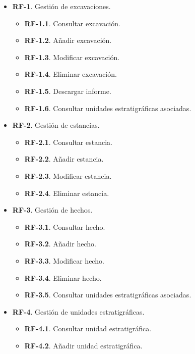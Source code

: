     \begin{itemize}
        \item \textbf{RF-1}. Gestión de excavaciones.
            \begin{itemize}
                \item \textbf{RF-1.1}. Consultar excavación.
                \item \textbf{RF-1.2}. Añadir excavación.
                \item \textbf{RF-1.3}. Modificar excavación.
                \item \textbf{RF-1.4}. Eliminar excavación.       
                \item \textbf{RF-1.5}. Descargar informe.       
                \item \textbf{RF-1.6}. Consultar unidades estratigráficas asociadas.            
            \end{itemize}
        \item \textbf{RF-2}. Gestión de estancias.
            \begin{itemize}
                \item \textbf{RF-2.1}. Consultar estancia.
                \item \textbf{RF-2.2}. Añadir estancia.
                \item \textbf{RF-2.3}. Modificar estancia.
                \item \textbf{RF-2.4}. Eliminar estancia.       
            \end{itemize}
        \item \textbf{RF-3}. Gestión de hechos.
            \begin{itemize}
                \item \textbf{RF-3.1}. Consultar hecho.
                \item \textbf{RF-3.2}. Añadir hecho.
                \item \textbf{RF-3.3}. Modificar hecho.
                \item \textbf{RF-3.4}. Eliminar hecho. 
                \item \textbf{RF-3.5}. Consultar unidades estratigráficas asociadas.          
            \end{itemize}
        \item \textbf{RF-4}. Gestión de unidades estratigráficas.
            \begin{itemize}
                \item \textbf{RF-4.1}. Consultar unidad estratigráfica.
                \item \textbf{RF-4.2}. Añadir unidad estratigráfica.

\end{itemize}
\end{itemize}
